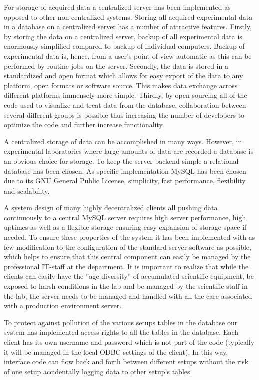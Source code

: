 For storage of acquired data a centralized server has been implemented as
opposed to other non-centralized systems\cite{McIntosh2003}. Storing all
acquired experimental data in a database on a centralized server has a number
of attractive features. Firstly, by storing the data on a centralized server,
backup of all experimental data is enormously simplified compared to backup of
individual computers. Backup of experimental data is, hence, from a user's
point of view automatic as this can be performed by routine jobs on the server.
Secondly, the data is stored in a standardized and open format which allows for
easy export of the data to any platform, open formats or software source. This
makes data exchange across different platforms immensely more simple. Thirdly,
by open sourcing all of the code used to visualize and treat data from the
database, collaboration between several different groups is possible thus
increasing the number of developers to optimize the code and further increase
functionality.

A centralized storage of data can be accomplished in many ways. However, in
experimental laboratories where large amounts of data are recorded a database
is an obvious choice for storage. To keep the server backend simple a
relational database has been chosen. As specific implementation MySQL has been
chosen due to its GNU General Public License\cite{gpl}, simplicity, fast
performance, flexibility and scalability.

A system design of many highly decentralized clients all pushing data
continuously to a central MySQL server requires high server performance, high
uptimes as well as a flexible storage ensuring easy expansion of storage space
if needed. To ensure these properties of the system it has been implemented
with as few modification to the configuration of the standard server software
as possible, which helps to ensure that this central component can easily be
managed by the professional IT-staff at the department. It is important to
realize that while the clients can easily have the ''age diversity'' of
accumulated scientific equipment, be exposed to harsh conditions in the lab and
be managed by the scientific staff in the lab, the server needs to be managed
and handled with all the care associated with a production environment server.

To protect against pollution of the various setups tables in the database our
system has implemented access rights to all the tables in the database. Each
client has its own username and password which is not part of the code
(typically it will be managed in the local ODBC-settings of the client). In
this way, interface code can flow back and forth between different setups
without the risk of one setup accidentally logging data to other setup's
tables.


